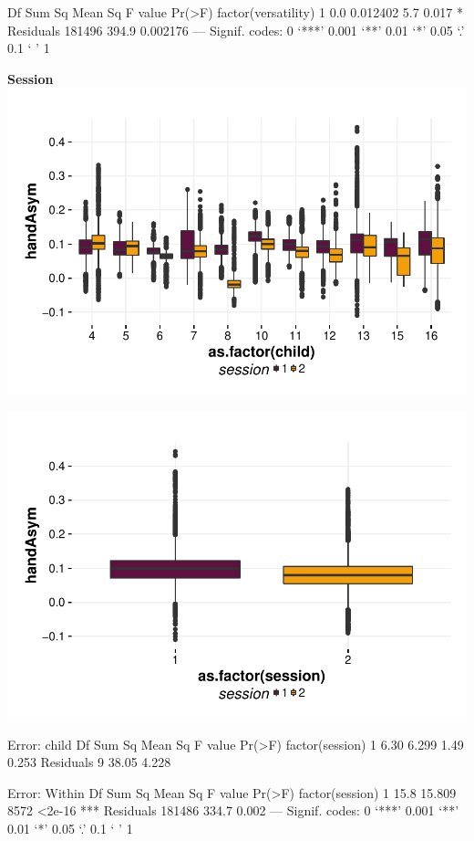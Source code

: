 \documentclass{article}
\begin{document}
\begin{Schunk}
\begin{Soutput}
                        Df Sum Sq  Mean Sq F value Pr(>F)  
factor(versatility)      1    0.0 0.012402     5.7  0.017 *
Residuals           181496  394.9 0.002176                 
---
Signif. codes:  0 ‘***’ 0.001 ‘**’ 0.01 ‘*’ 0.05 ‘.’ 0.1 ‘ ’ 1
\end{Soutput}
\end{Schunk}

\textbf{Session}
\includegraphics{features-plot_handAsymmetry_child_session_quiz}

\includegraphics{features-plot_handAsymmetry_session_quiz}

\begin{Schunk}
\begin{Soutput}
Error: child
                Df Sum Sq Mean Sq F value Pr(>F)
factor(session)  1   6.30   6.299    1.49  0.253
Residuals        9  38.05   4.228               

Error: Within
                    Df Sum Sq Mean Sq F value Pr(>F)    
factor(session)      1   15.8  15.809    8572 <2e-16 ***
Residuals       181486  334.7   0.002                   
---
Signif. codes:  0 ‘***’ 0.001 ‘**’ 0.01 ‘*’ 0.05 ‘.’ 0.1 ‘ ’ 1
\end{Soutput}
\end{Schunk}
\end{document}
